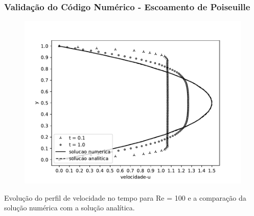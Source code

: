 \begin{frame}
 \frametitle{\small Validação do Código Numérico - Escoamento de Poiseuille}
\begin{figure}
  \centering
  \vspace{-1.5cm}
  \includegraphics[scale=0.6]{images/poiseuille_velocity.pdf}
\end{figure}
\vspace{-0.2cm}
\centering \scriptsize Evolução do perfil de velocidade no tempo para Re = 100 e a comparação da
solução numérica com a solução analítica.
\end{frame}



